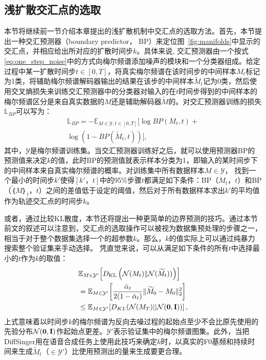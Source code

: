 \subsection{浅扩散交汇点的选取}
\label{sec:boundary_prediction}
本节将继续前一节介绍本章提出的浅扩散机制中交汇点的选取方法。首先，本节提出一种交汇预测器（boundary predictor， BP）来定位图~\ref{fig:manifolds}中显示的交汇点，并相应给出所对应的扩散时间步$k$。具体来说, 交汇预测器由一个按式\eqref{eq:one_step_noise}中的方式向梅尔频谱添加噪声的模块和一个分类器组成。给定过程中某一扩散时间步$t\in[0, T]$，将真实梅尔频谱在该时间步的中间样本$M_t$标记为1类，将辅助梅尔频谱解码器输出的结果在该步的中间样本$\widetilde{M}_t$记为0类，然后使用交叉熵损失来训练交汇预测器中的分类器对输入的在$t$时间步得到的中间样本的梅尔频谱区分是来自真实数据的$M$还是辅助解码器$\widetilde{M}$的。对交汇预测器训练的损失$\mathbb{L}_{BP}$可以写为：
\begin{align*}
    \mathbb{L}_{BP} = - \mathbb{E}_{M\in\mathcal{Y}, t \in [0, T]} [\log BP(M_t, t) + \\
    \log (1-BP(\widetilde{M}_t, t))],
\end{align*}
其中，$\mathcal{Y}$是梅尔频谱训练集。当交汇预测器训练好之后，就可以使用预测器BP的预测值来决定$k$的值，此时BP的预测值就表示样本分类为1，即输入的某时间步下的中间样本来自真实梅尔频谱的概率。对训练集中所有数据样本$ M \in \mathcal{Y}$，
找到一个最小的时间步$k'$使得$[k'，t]$中的95\%步骤$t$都满足如下条件：BP（$M_t$，$t$）和BP（$\widetilde｛M｝_t$，$t$）之间的差值低于设定的阈值，然后对于所有数据样本求出$k'$的平均值作为轨迹交汇点的时间步$k$。

或者，通过比较KL散度，本节还将提出一种更简单的边界预测的技巧。通过本节前文的叙述可以注意到，交汇点的选取操作可以被视为数据集预处理的步骤之一，相当于对于整个数据集选择一个的超参数$k$。那么，$k$的值实际上可以通过纯暴力搜索整个验证集来手动选择。
凭直觉来说，可以从满足如下条件的所有$t$中选择最小的$t$作为$k$的取值：
\begin{align}
    &\mathbb{E}_{M\in \mathcal{Y'}}\!\left[D_{\mathrm{KL}}\left(\mathcal{N}(M_t)  \| \mathcal{N}(\widetilde{M}_t))\right)\right] \\
    &=  \mathbb{E}_{M\in \mathcal{Y'}}\!\left[\frac{\bar\alpha_t}{2(1-\bar\alpha_t)} \|\widetilde{M}_0-M_0 \| _2^2\right]\\ &\leq \mathbb{E}_{M\in \mathcal{Y'}}\!\left[D_{KL}(\mathcal{N}(M_T) || \mathcal{N}(\mathbf{0}, \mathbf{I}))\right],
\end{align}
上式意味着以时间步$k$的梅尔频谱为反向去噪过程的起始点至少不会比原先使用的先验分布$\mathcal{N}(\mathbf{0}, \mathbf{I})$作起始点更差。$\mathcal{Y'}$表示验证集中的梅尔频谱图集。此外，当把DiffSinger用在语音合成任务上使用此技巧来确定$k$时，以真实的F0基频和持续时间来生成$\widetilde{M}_t$（$\in \mathcal{Y'}$）比使用预测出的量来生成要更合理。
